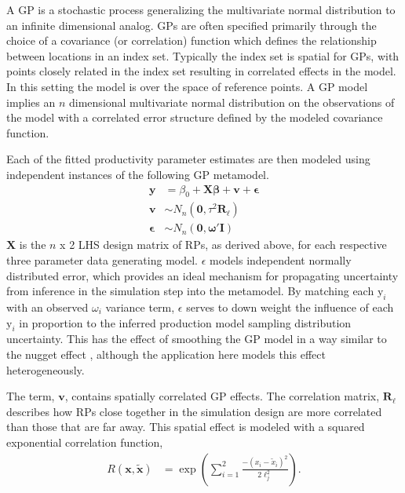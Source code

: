 \documentclass[12pt]{article}
\begin{document}
%
A GP is a stochastic process generalizing the multivariate normal distribution 
to an infinite dimensional analog. GPs are often specified primarily through the
choice of a covariance (or correlation) function which defines the relationship 
between locations in an index set. Typically the index set is spatial for GPs, 
with points closely related in the index set resulting in correlated effects in 
the model. In this setting the model is over the space of reference points. 
A GP model implies an $n$ dimensional multivariate normal distribution on the 
observations of the model with a correlated error structure defined by the 
modeled covariance function.

%
Each of the fitted productivity parameter estimates are then modeled using 
independent instances of the following GP metamodel. %
\begin{align} \label{GPModel}
	\textbf{y} &= \beta_0 + \bm{X}\bm{\beta} + \bm{v} + \bm{\epsilon} \nonumber \\
	\bm{v} &\sim N_n(\bm{0}, \tau^2 \bm{R_{\ell}}) \\
	\bm{\epsilon} &\sim N_n(\bm{0}, \bm{\omega}'\bm{I}) \nonumber
\end{align}
$\bm{X}$ is the $n$ x 2 LHS design matrix of RPs, as derived above, for each respective 
three parameter data generating model. 
$\epsilon$ models independent normally distributed error, which provides an 
ideal mechanism for propagating uncertainty from inference in the simulation 
step into the metamodel. By matching each $\text{y}_i$ with an observed $\omega_i$ 
variance term, $\epsilon$ serves to down weight the influence of each $\text{y}_i$ 
in proportion to the inferred production model sampling distribution 
uncertainty. This has the effect of smoothing the GP model in a way similar to 
the nugget effect , although the application 
here models this effect heterogeneously.

The term, $\bm{v}$, contains spatially correlated GP effects. The correlation 
matrix, $\bm{R_{\ell}}$ describes how RPs close together in the simulation design 
are more correlated than those that are far away. This spatial effect is modeled 
with a squared exponential correlation function,
%
\begin{align}   \label{corModel}
R(\bm{x}, \bm{\tilde x}) &= \exp\left( \sum_{i=1}^2 \frac{-(x_{i}-\tilde x_{i})^2}{2\ell_j^2} \right). 
\end{align}
\end{document}
